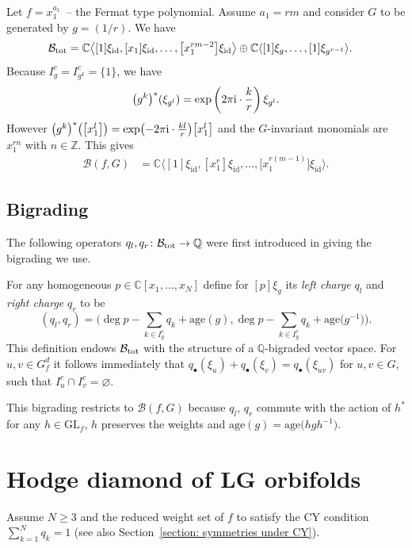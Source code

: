 \documentclass[10pt,a4paper]{amsart}
\numberwithin{equation}{section}
\newcommand{\CC}{{\mathbb{C}}}
\newcommand{\QQ}{{\mathbb{Q}}}
\newcommand{\ZZ}{{\mathbb{Z}}}
\newcommand{\GL}{{\mathrm{GL}}}
\newcommand{\id}{\mathrm{id}}
\newcommand{\age}{\mathrm{age}}
\def\B{{\mathcal B}}
\begin{document}
\begin{Example}\label{example: Fermat type state space}
	Let $f = x_1^{a_1}$~-- the Fermat type polynomial. Assume $a_1 = rm$ and consider $G$ to be generated by $g = (1/r)$. We have
	\begin{align*}
		\B_{\rm tot} &= \CC \bigl\langle [1]\xi_{\id}, [x_1]\xi_{\id}, \dots,\bigl[x_1^{rm-2}\bigr] \xi_\id \bigr\rangle \oplus \CC\langle [1]\xi_{g},\dots,[1]\xi_{g^{r-1}} \rangle.
	\end{align*}
	Because $I_g^c = I_{g^k}^c = \{1\}$, we have
	\[
		 \bigl(g^k \bigr)^*(\xi_{g^l}) = \exp\left( 2 \pi {\rm i} \cdot \frac{k}{r}\right) \xi_{g^l}.
	\]
	However $\bigl(g^k\bigr)^*\bigl(\bigl[x_1^l\bigr]\bigr) = \exp\bigl(-2 \pi {\rm i} \cdot \frac{kl}{r}\bigr) \bigl[x_1^l\bigr]$ and the $G$-invariant monomials are $x_1^{rn}$ with $n \in \ZZ$. This gives
	\begin{align*}
		\B(f,G) &= \CC \bigl\langle [1]\xi_{\id},[x_1^r]\xi_{\id}, \dots, \bigl[x_1^{r(m-1)}\bigr]\xi_{\id}\bigr\rangle.
	\end{align*}
\end{Example}

\subsection{Bigrading}\label{section: bigrading}
The following operators $q_l, q_r \colon \B_{\rm tot} \to \QQ$ were first introduced in \cite{IV90} giving the bigrading we use.

For any homogeneous $p \in \CC[x_1,\dots,x_N]$ define for $[p]\xi_g$ its {\itshape left charge} $q_l$ and {\itshape right charge} $q_r$ to be
\begin{equation}\label{eq: left right charges}
 (q_l, q_r) = \biggl(\deg p - \sum_{k \in I_g^c} q_{k} + \age{(g)}, \deg p - \sum_{k \in I_g^c} q_{k} + \age{\bigl(g^{-1}\bigr)} \biggr).
\end{equation}
This definition endows $\B_{\rm tot}$ with the structure of a $\QQ$-bigraded vector space.
For $u,v\in G_f^d$ it follows immediately that $q_\bullet (\xi_u) + q_\bullet (\xi_v) = q_\bullet (\xi_{uv})$ for $u,v\in G$, such that $I_u^c \cap I_v^c = \varnothing$.

This bigrading restricts to $\B(f,G)$ because $q_l$, $q_r$ commute with the action of $h^\ast$ for any $h \in \GL_f$, $h$ preserves the weights and $\age(g)=\age\bigl(hgh^{-1}\bigr)$.


\section{Hodge diamond of LG orbifolds}
Assume $N \ge 3$ and the reduced weight set of $f$ to satisfy the CY condition ${\sum_{k=1}^N q_k = 1}$ (see also Section~\ref{section: symmetries under CY}).
\end{document}
